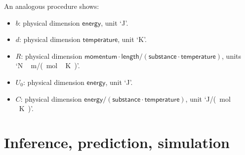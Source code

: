 \documentclass[a4paper,12pt,%
onecolumn,oneside,%
british%
]{memoir}
\renewcommand*{\|}[1][]{\nonscript\:#1\vert\nonscript\:\mathopen{}}
\newcommand{\textdim}{\textsf}
\newcommand*{\yU}{U}
\begin{document}
An analogous procedure shows:
\begin{itemize}
\item $b$: physical dimension $\textdim{energy}$, unit \enquote*{\unit{J}}.
\item $d$: physical dimension $\textdim{temperature}$, unit \enquote*{\unit{K}}.
\item $R$: physical dimension $\textdim{momentum}\cdot\textdim{length}/(\textdim{substance}\cdot\textdim{temperature})$, units \enquote*{\unit{N\,m/(mol\,K)}}.
\item $\yU_{0}$: physical dimension $\textdim{energy}$, unit \enquote*{\unit{J}}.
\item $C$: physical dimension $\textdim{energy}/(\textdim{substance}\cdot\textdim{temperature})$, unit \enquote*{\unit{J/(mol\,K)}}.
\end{itemize}













\printpagenotes*
\cleartooddpage
\chapter{Inference, prediction, simulation}
\label{cha:inference}
\setcounter{section}{-1}
\end{document}

